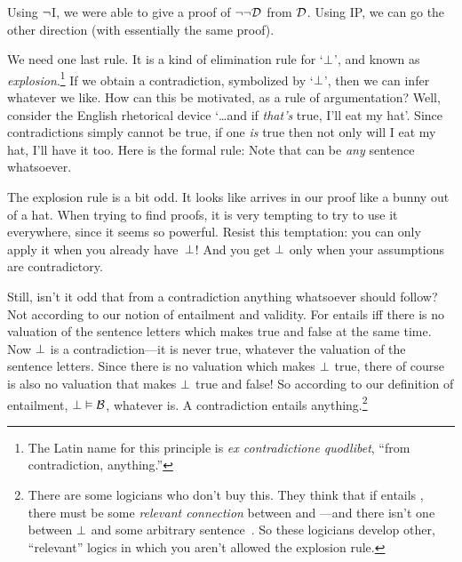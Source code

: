 Using $\neg$I, we were able to give a proof of $\neg\neg\mathcal{D}$ from $\mathcal{D}$. Using IP, we can go the other direction (with essentially the same proof).
	\begin{fitchproof}
		\open
		\close
	\end{fitchproof}

We need one last rule. It is a kind of elimination rule for `$\bot$', and known as \emph{explosion}.\footnote{The Latin name for this principle is \emph{ex contradictione quodlibet}, ``from contradiction, anything.''} If we obtain a contradiction, symbolized by `$\bot$', then we can infer whatever we like. How can this be motivated, as a rule of argumentation? Well, consider the English rhetorical device `\ldots and if \emph{that's} true, I'll eat my hat'. Since contradictions simply cannot be true, if one \emph{is} true then not only will I eat my hat, I'll have it too. Here is the formal rule:
Note that  can be \emph{any} sentence whatsoever.

The explosion rule is a bit odd. It looks like  arrives in our proof like a bunny out of a hat. When trying to find proofs, it is very tempting to try to use it everywhere, since it seems so powerful. Resist this temptation: you can only apply it when you already have~$\bot$!  And you get $\bot$ only when your assumptions are contradictory.

Still, isn't it odd that from a contradiction anything whatsoever should follow? Not according to our notion of entailment and validity. For  entails  iff there is no valuation of the sentence letters which makes  true and  false at the same time. Now $\bot$ is a contradiction---it is never true, whatever the valuation of the sentence letters. Since there is no valuation which makes $\bot$ true, there of course is also no valuation that makes $\bot$ true and  false! So according to our definition of entailment, $\bot \vDash \mathcal{B}$, whatever  is. A contradiction entails anything.\footnote{There are some logicians who don't buy this. They think that if  entails , there must be some \emph{relevant connection} between  and ---and there isn't one between $\bot$ and some arbitrary sentence~. So these logicians develop other, ``relevant'' logics in which you aren't allowed the explosion rule.}

